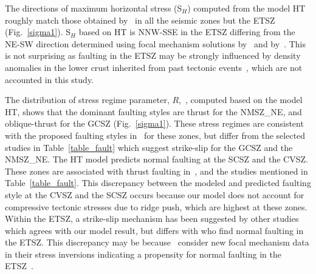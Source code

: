 \documentclass[draft,linenumbers]{agujournal2018}
\begin{document}
  
%
%
The directions of maximum horizontal stress (S$_H$) computed from the model HT roughly match those obtained by~\citet{levandowski2018updated} in all the seismic zones but the ETSZ (Fig.~\ref{sigma1}).  S$_{H}$ based on HT is NNW-SSE in the ETSZ differing from the NE-SW direction determined using focal mechanism solutions by~\citet{levandowski2018updated} and by~\citet{mazzotti2010state}. This is not surprising as faulting in the ETSZ may be strongly influenced by density anomalies in the lower crust inherited from past tectonic events~\citep{levandowski2018updated}, which are not accounted in this study.

The distribution of stress regime parameter, $R$,~\citep{delvaux1997paleostress,simpson1997quantifying}, computed based on the model HT, shows that the dominant faulting styles are thrust for the NMSZ\_NE, and oblique-thrust for the GCSZ (Fig.~\ref{sigma1}). These stress regimes are consistent with the proposed faulting styles in~\citet{levandowski2018updated} for these zones, but differ from the selected studies in Table~\ref{table_fault} which suggest strike-slip for the GCSZ and the NMSZ\_NE.  
The HT model predicts normal faulting at the SCSZ and the CVSZ. These zones are associated with thrust faulting in~\citet{levandowski2018updated}, and the studies mentioned in Table~\ref{table_fault}. This discrepancy between the modeled and predicted faulting style at the CVSZ and the SCSZ occurs because our model does not account for compressive tectonic stresses due to ridge push, which are highest at these zones. Within the ETSZ, a strike-slip mechanism has been suggested by other studies~\citep[Table 2][]{mazzotti2010state, powell2016grenville} which agrees with our model result, but differs with \citet{levandowski2018updated} who find normal faulting in the ETSZ.  This discrepancy may be because~\citet{levandowski2018updated} consider new focal mechanism data in their stress inversions indicating a propensity for normal faulting in the ETSZ~\citep[also found in][]{cooley2015new}.
\end{document}
